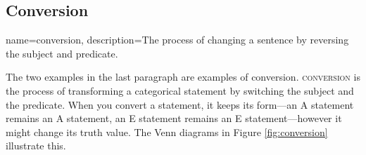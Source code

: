 \subsection{Conversion}

{
name=conversion,
description={The process of changing a sentence by reversing the subject and predicate.}
}


The two examples in the last paragraph are examples of conversion. \textsc{\gls{conversion}} \label{defConversion} is the process of transforming a categorical statement by switching the subject and the predicate. When you convert a statement, it keeps its form---an A statement remains an A statement, an E statement remains an E statement---however it might change its truth value.  The Venn diagrams in Figure \ref{fig:conversion} illustrate this.

